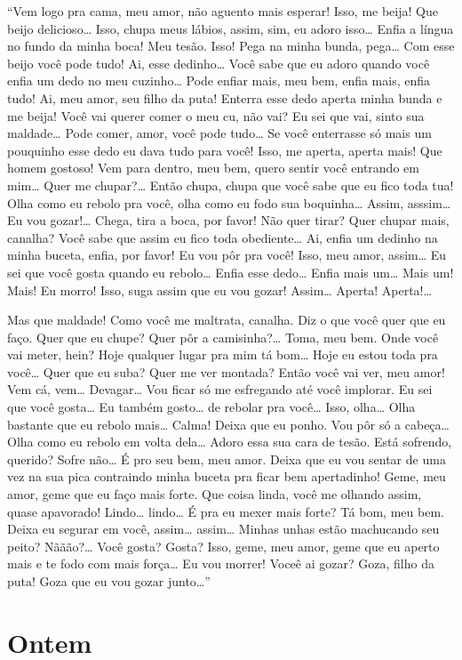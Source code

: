 ``Vem logo pra cama, meu amor, não aguento mais esperar! Isso, me beija!
Que beijo delicioso… Isso, chupa meus lábios, assim, sim, eu
adoro isso… Enfia a língua no fundo da minha boca! Meu tesão.
Isso! Pega na minha bunda, pega… Com esse beijo você pode tudo!
Ai, esse dedinho… Você sabe que eu adoro quando você enfia um
dedo no meu cuzinho… Pode enfiar mais, meu bem, enfia mais, enfia
tudo! Ai, meu amor, seu filho da puta! Enterra esse dedo aperta minha
bunda e me beija! Você vai querer comer o meu cu, não vai? Eu sei que
vai, sinto sua maldade… Pode comer, amor, você pode tudo…
Se você enterrasse só mais um pouquinho esse dedo eu dava tudo para
você! Isso, me aperta, aperta mais! Que homem gostoso! Vem para dentro,
meu bem, quero sentir você entrando em mim… Quer me
chupar?… Então chupa, chupa que você sabe que eu fico toda tua!
Olha como eu rebolo pra você, olha como eu fodo sua boquinha…
Assim, asssim… Eu vou gozar!… Chega, tira a boca, por
favor! Não quer tirar? Quer chupar mais, canalha? Você sabe que assim eu
fico toda obediente… Ai, enfia um dedinho na minha buceta, enfia,
por favor! Eu vou pôr pra você! Isso, meu amor, assim… Eu sei que
você gosta quando eu rebolo… Enfia esse dedo… Enfia mais
um… Mais um! Mais! Eu morro! Isso, suga assim que eu vou gozar!
Assim… Aperta! Aperta!…

Mas que maldade! Como você me maltrata, canalha. Diz o que você quer que
eu faço. Quer que eu chupe? Quer pôr a camisinha?… Toma, meu bem.
Onde você vai meter, hein? Hoje qualquer lugar pra mim tá bom…
Hoje eu estou toda pra você… Quer que eu suba? Quer me ver
montada? Então você vai ver, meu amor! Vem cá, vem…
Devagar… Vou ficar só me esfregando até você implorar. Eu sei que
você gosta… Eu também gosto… de rebolar pra você…
Isso, olha… Olha bastante que eu rebolo mais… Calma! Deixa
que eu ponho. Vou pôr só a cabeça… Olha como eu rebolo em volta
dela… Adoro essa sua cara de tesão. Está sofrendo, querido? Sofre
não… É pro seu bem, meu amor. Deixa que eu vou sentar de uma vez
na sua pica contraindo minha buceta pra ficar bem apertadinho! Geme, meu
amor, geme que eu faço mais forte. Que coisa linda, você me olhando
assim, quase apavorado! Lindo… lindo… É pra eu mexer mais
forte? Tá bom, meu bem. Deixa eu segurar em você, assim…
assim… Minhas unhas estão machucando seu peito? Nããão?…
Você gosta? Gosta? Isso, geme, meu amor, geme que eu aperto mais e te
fodo com mais força… Eu vou morrer! Voceê ai gozar? Goza, filho
da puta! Goza que eu vou gozar junto…''

\chapter{Ontem}

